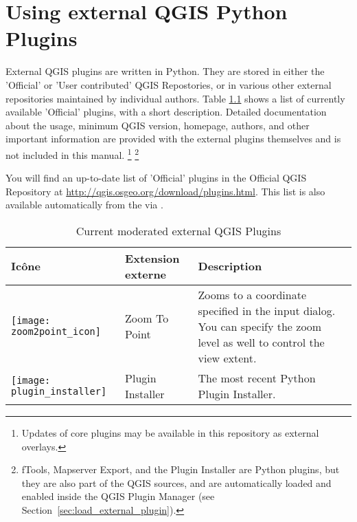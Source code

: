 
\chapter{Using external QGIS Python Plugins}\label{sec:external_plugins}


External QGIS plugins are written in Python. They are stored in either 
the 'Official' or 'User contributed' QGIS Repostories, or in various other external 
repositories maintained by individual authors. 
Table \ref{tab:external_plugins} shows a list of currently available 'Official' 
plugins, with a short description.
Detailed documentation about the usage, minimum QGIS version, homepage, authors, 
and other important information are provided with the external plugins themselves 
and is not included in this manual.
\footnote{Updates of core plugins may be 
available in this repository as external overlays.} 
\footnote{fTools, Mapserver Export, and the Plugin Installer are Python plugins, 
but they are also part of the QGIS sources, and are automatically loaded and 
enabled inside the QGIS Plugin Manager (see Section~\ref{sec:load_external_plugin}).}

You will find an up-to-date list of 'Official' plugins in the Official QGIS 
Repository at \url{http://qgis.osgeo.org/download/plugins.html}. This list is 
also available automatically from the  
via .

\begin{table}[H]
\centering
 \begin{tabular}{|l|l|p{8cm}|}
\hline \textbf{Icône} & \textbf{Extension externe} & \textbf{Description}\\
\hline
\texttt{[image: zoom2point\_icon]}
 & Zoom To Point \index{plugins!Zoom To Point} & Zooms to a coordinate 
  specified in the input dialog. You can specify the zoom level as well to 
  control the view extent.\\
\hline
\texttt{[image: plugin\_installer]}
 & Plugin Installer \index{plugins!Plugin Installer} & The most recent Python Plugin Installer.\\
\hline
\end{tabular}
\caption{Current moderated external QGIS Plugins}\label{tab:external_plugins}
\end{table}

